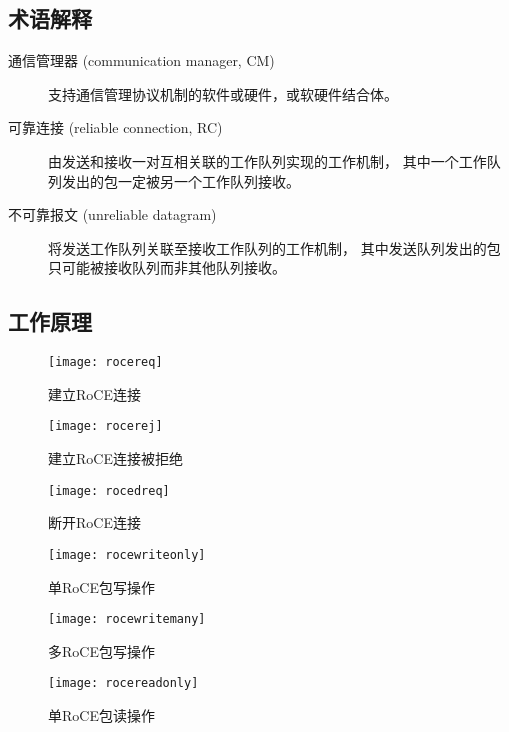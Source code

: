 \subsection{术语解释}
\begin{description}
\item[通信管理器 (communication manager, CM)]支持通信管理协议机制的软件或硬件，或软硬件结合体。
\item[可靠连接 (reliable connection, RC)]由发送和接收一对互相关联的工作队列实现的工作机制，
其中一个工作队列发出的包一定被另一个工作队列接收。
\item[不可靠报文 (unreliable datagram)]将发送工作队列关联至接收工作队列的工作机制，
其中发送队列发出的包只可能被接收队列而非其他队列接收。\cite{volume1}
\end{description}

\subsection{工作原理}
\begin{figure}[htbp]
\centering
\texttt{[image: rocereq]}
\caption{建立RoCE连接}\label{fig:rocereq}
\end{figure}

\begin{figure}[htbp]
\centering
\texttt{[image: rocerej]}
\caption{建立RoCE连接被拒绝}\label{fig:rocerej}
\end{figure}

\begin{figure}[htbp]
\centering
\texttt{[image: rocedreq]}
\caption{断开RoCE连接}\label{fig:rocedreq}
\end{figure}

\begin{figure}[htbp]
\centering
\texttt{[image: rocewriteonly]}
\caption{单RoCE包写操作}\label{fig:rocewriteonly}
\end{figure}

\begin{figure}[htbp]
\centering
\texttt{[image: rocewritemany]}
\caption{多RoCE包写操作}\label{fig:rocewritemany}
\end{figure}

\begin{figure}[htbp]
\centering
\texttt{[image: rocereadonly]}
\caption{单RoCE包读操作}\label{fig:rocereadonly}
\end{figure}

